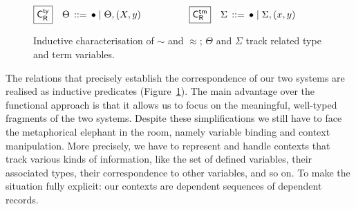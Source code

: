 \documentclass[a4paper,UKenglish]{lipics-v2016}
\newcommand{\ms}{\,}
\newcommand{\mrel}[1]{\mathrel{\ms #1 \ms}}
\newcommand{\bnfdef}{\mrel{::=}}
\newcommand{\TyCtxR}{\ensuremath{\mathsf{C_{R}^{ty}}}}
\newcommand{\TmCtxR}{\ensuremath{\mathsf{C_{R}^{tm}}}}
\newcommand{\of}{\ensuremath{\!:\!}}
\newcommand{\cc}[2]{#1;#2} %
\newcommand{\tyr}{\mathrel{\sim}}
\newcommand{\tmr}{\mathrel{\approx}}
\newcommand{\Prp}{\ensuremath{\textrm{\textasteriskcentered}}}
\newcommand{\nAll}[1]{\ensuremath{\forall #1.\,}}
\newcommand{\Lam}[1]{\ensuremath{\lambda #1.\,}}
\newcommand{\nTyLam}[1]{\ensuremath{\Lambda #1.\,}}
\newcommand{\Prod}[1]{\ensuremath{\Pi #1.\,}}
\newcommand{\emptyctx}{\ensuremath{\bullet}}
\theoremstyle{plain}
\begin{document}
\begin{figure}[t]
  \begin{center}
    \small
    \begin{align*}
      \Aboxed{\TyCtxR} & \Theta &\bnfdef \emptyctx \mid \Theta, (X,y) & \qquad\qquad\Aboxed{\TmCtxR} &\Sigma &\bnfdef \emptyctx \mid \Sigma, (x,y)\hspace{6em}
    \end{align*}
    \vspace{-2.5em}
  \end{center}
  \caption{Inductive characterisation of $\tyr$ and $\tmr$; $\Theta$ and $\Sigma$ track related type and term variables.\vspace{-1em}}
  \label{fig:rel}
\end{figure}

The relations that precisely establish the correspondence of our two systems are realised as inductive predicates (Figure~\ref{fig:rel}).
The main advantage over the functional approach is that it allows us to focus on the meaningful, well-typed fragments of the two systems.
Despite these simplifications we still have to face the metaphorical elephant in the room, namely variable binding and context manipulation.
More precisely, we have to represent and handle contexts that track various kinds of information, like the set of defined variables, their associated types, their correspondence to other variables, and so on.
To make the situation fully explicit: our contexts are dependent sequences of dependent records.
\end{document}
